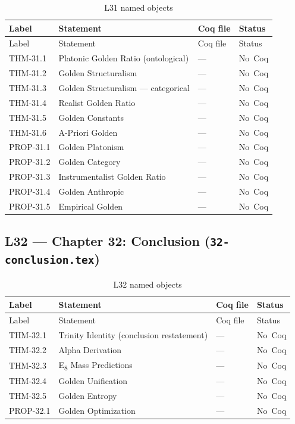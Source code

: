 \begin{longtable}{lp{6cm}ll}
\toprule
Label & Statement & Coq file & Status \\
\midrule
\endfirsthead
\toprule
Label & Statement & Coq file & Status \\
\midrule
\endhead
\bottomrule
\endfoot
\bottomrule
\caption{L31 named objects}
\endlastfoot
THM-31.1 & Platonic Golden Ratio (ontological) & --- & No~Coq \\
THM-31.2 & Golden Structuralism & --- & No~Coq \\
THM-31.3 & Golden Structuralism --- categorical & --- & No~Coq \\
THM-31.4 & Realist Golden Ratio & --- & No~Coq \\
THM-31.5 & Golden Constants & --- & No~Coq \\
THM-31.6 & A-Priori Golden & --- & No~Coq \\
PROP-31.1 & Golden Platonism & --- & No~Coq \\
PROP-31.2 & Golden Category & --- & No~Coq \\
PROP-31.3 & Instrumentalist Golden Ratio & --- & No~Coq \\
PROP-31.4 & Golden Anthropic & --- & No~Coq \\
PROP-31.5 & Empirical Golden & --- & No~Coq \\
\end{longtable}

\subsection{L32 — Chapter 32: Conclusion (\texttt{32-conclusion.tex})}
\label{sec:A-L32}

\begin{longtable}{lp{6cm}ll}
\toprule
Label & Statement & Coq file & Status \\
\midrule
\endfirsthead
\toprule
Label & Statement & Coq file & Status \\
\midrule
\endhead
\bottomrule
\endfoot
\bottomrule
\caption{L32 named objects}
\endlastfoot
THM-32.1 & Trinity Identity (conclusion restatement) & --- & No~Coq \\
THM-32.2 & Alpha Derivation & --- & No~Coq \\
THM-32.3 & E\textsubscript{8} Mass Predictions & --- & No~Coq \\
THM-32.4 & Golden Unification & --- & No~Coq \\
THM-32.5 & Golden Entropy & --- & No~Coq \\
PROP-32.1 & Golden Optimization & --- & No~Coq \\
\end{longtable}


